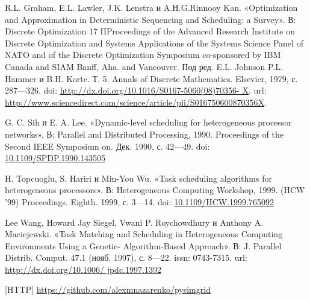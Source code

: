 \begin{thebibliography}{9}	
\large

 R.L. Graham, E.L. Lawler, J.K. Lenstra и A.H.G.Rinnooy Kan. «Optimization and Approximation in Deterministic Sequencing and Scheduling: a Survey». В: Discrete Optimization
17
IIProceedings of the Advanced Research Institute on Discrete Optimization and Systems Applications of the Systems Science Panel of NATO and of the Discrete Optimization Symposium co-sponsored by IBM Canada and SIAM Banff, Aha. and Vancouver. Под ред. E.L. Johnson P.L. Hammer и B.H. Korte. Т. 5. Annals of Discrete Mathematics. Elsevier, 1979, с. 287—326. doi: \url{http://dx.doi.org/10.1016/S0167-5060(08)70356- X}. url: \url{http://www.sciencedirect.com/science/article/pii/S016750600870356X}.


 G. C. Sih и E. A. Lee. «Dynamic-level scheduling for heterogeneous processor networks». В: Parallel and Distributed Processing, 1990. Proceedings of the Second IEEE Symposium on. Дек. 1990, с. 42—49. doi: \href{http://ieeexplore.ieee.org/document/143505/}{10.1109/SPDP.1990.143505}


 H. Topcuoglu, S. Hariri и Min-You Wu. «Task scheduling algorithms for heterogeneous processors». В: Heterogeneous Computing Workshop, 1999. (HCW ’99) Proceedings. Eighth. 1999, с. 3—14. doi: \href{http://ieeexplore.ieee.org/document/765092/}{10.1109/HCW.1999.765092}

 Lee Wang, Howard Jay Siegel, Vwani P. Roychowdhury и Anthony A. Maciejewski. «Task Matching and Scheduling in Heterogeneous Computing Environments Using a Genetic- Algorithm-Based Approach». В: J. Parallel Distrib. Comput. 47.1 (нояб. 1997), с. 8—22. issn: 0743-7315. url: \url{http://dx.doi.org/10.1006/ jpdc.1997.1392}

 [HTTP] \href{https://github.com/alexmnazarenko/pysimgrid}{https://github.com/alexmnazarenko/pysimgrid}


\end{thebibliography}